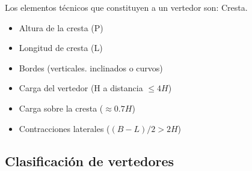 Los elementos técnicos que constituyen a un vertedor son: Cresta.
\begin{itemize}
    \item Altura de la cresta (P)
    \item Longitud de cresta (L)
    \item Bordes (verticales. inclinados o curvos)
    \item Carga del vertedor (H a distancia $\leq 4H$)
    \item Carga sobre la cresta ($\approx 0.7H$)
    \item Contracciones laterales ($(B-L)/2>2H$)
\end{itemize}

\subsection{Clasificación de vertedores}

